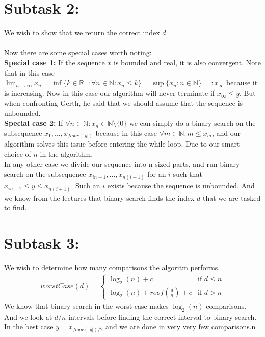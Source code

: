 \documentclass{article}
\theoremstyle{remark}
\numberwithin{equation}{section}
\begin{document}
\section*{Subtask 2:}
We wish to show that we return the correct index $d$.
\\\\Now there are some special cases worth noting:
\\\textbf{Special case 1:} If the sequence $x$ is bounded and real, it is also convergent. Note that in this case $\lim_{n\rightarrow\infty} x_n = \inf \{k\in\mathbb{R}_+ : \forall n\in\mathbb{N} : x_n \leq k\} = \sup \{x_n : n\in\mathbb{N} \} =: x_\infty$ because it is increasing. Now in this case our algorithm will never terminate if $x_\infty \leq y$. But when confronting Gerth, he said that we should assume that the sequence is unbounded.
\\\textbf{Special case 2:} If $\forall n\in\mathbb{N} : x_n\in\mathbb{N}\setminus\{0\}$ we can simply do a binary search on the subsequence $x_1,\dots,x_{floor(|y|)}$ because in this case $\forall m\in\mathbb{N}:m\leq x_m$, and our algorithm solves this issue before entering the while loop. Due to our smart choice of $n$ in the algorithm.
\\In any other case we divide our sequence into n sized parts, and run binary search on the subsequence $x_{in+1},\dots,x_{n(i+1)}$ for an $i$ such that $x_{in+1}\leq y\leq x_{n(i+1)}$. Such an $i$ exists because the sequence is unbounded. And we know from the lectures that binary search finds the index $d$ that we are tasked to find.
\section*{Subtask 3:}
We wish to determine how many comparisons the algoritm performs.
\begin{align*}
	worstCase(d) = \begin{cases}
	\log_2(n)+c & \text{if } d\leq n \\
	\log_2(n)+roof(\frac{d}{n}) +c & \text{if } d >n
	\end{cases}
\end{align*}
We know that binary search in the worst case makes $\log_2(n)$ comparisons. And we look at $d/n$ intervals before finding the correct interval to binary search.
\\In the best case $y = x_{floor(|y|)/2}$ and we are done in very very few comparisons.n
\end{document}

